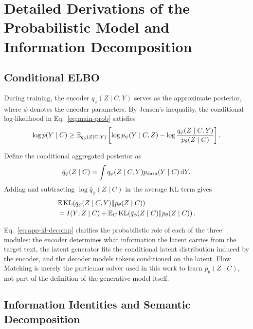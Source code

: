 \section{Detailed Derivations of the Probabilistic Model and Information Decomposition}
\label{app:basic}

\subsection{Conditional ELBO}

During training, the encoder $q_\phi(Z\mid C,Y)$ serves as the approximate posterior, where $\phi$ denotes the encoder parameters. By Jensen's inequality, the conditional log-likelihood in Eq.~\eqref{eq:main-prob} satisfies
\begin{equation}
    \log p(Y\mid C)
    \ge
    \mathbb{E}_{q_\phi(Z\mid C,Y)}
    \left[
      \log p_\psi(Y\mid C,Z)
      -
      \log\frac{q_\phi(Z\mid C,Y)}{p_\theta(Z\mid C)}
    \right].
\label{eq:app-elbo}
\end{equation}

Define the conditional aggregated posterior as
\begin{equation}
    \bar q_\phi(Z\mid C)
    =
    \int q_\phi(Z\mid C,Y)p_{\mathrm{data}}(Y\mid C)\,\mathrm{d} Y.
    \label{eq:app-agg}
\end{equation}
Adding and subtracting $\log \bar q_\phi(Z\mid C)$ in the average KL term gives
\begin{equation}
\begin{aligned}
&\mathbb{E}\operatorname{KL}\!\left(q_\phi(Z\mid C,Y)\|p_\theta(Z\mid C)\right)\\
&=I(Y;Z\mid C)
+\mathbb{E}_C\operatorname{KL}\!\left(\bar q_\phi(Z\mid C)\|p_\theta(Z\mid C)\right).
\end{aligned}
\label{eq:app-kl-decomp}
\end{equation}

Eq.~\eqref{eq:app-kl-decomp} clarifies the probabilistic role of each of the three modules: the encoder determines what information the latent carries from the target text, the latent generator fits the conditional latent distribution induced by the encoder, and the decoder models tokens conditioned on the latent. Flow Matching is merely the particular solver used in this work to learn $p_\theta(Z\mid C)$, not part of the definition of the generative model itself.

\subsection{Information Identities and Semantic Decomposition}

